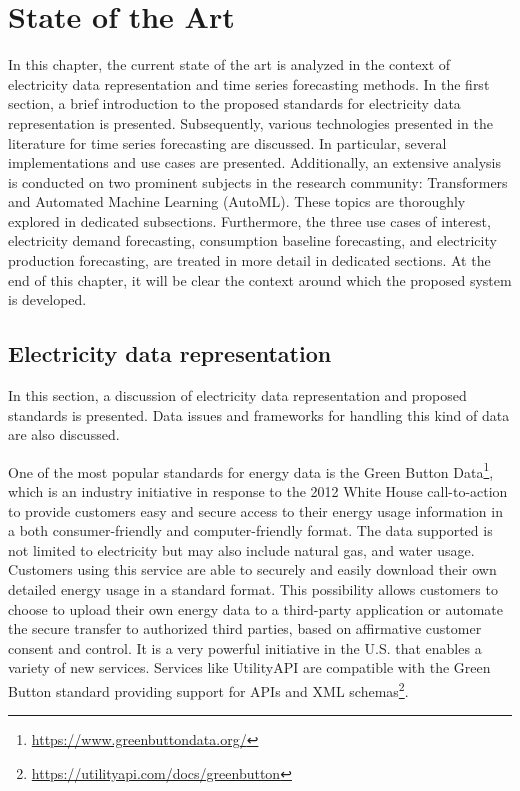 \chapter{State of the Art}
\label{cha:soa}
\vspace{0.4 cm}

In this chapter, the current state of the art is analyzed in the context of electricity data representation and time series forecasting methods.
In the first section, a brief introduction to the proposed standards for electricity data representation is presented.
Subsequently, various technologies presented in the literature for time series forecasting are discussed.
In particular, several implementations and use cases are presented.
Additionally, an extensive analysis is conducted on two prominent subjects in the research community: Transformers and Automated Machine Learning (AutoML).
These topics are thoroughly explored in dedicated subsections.
Furthermore, the three use cases of interest, electricity demand forecasting, consumption baseline forecasting, and electricity production forecasting, are treated in more detail in dedicated sections.
At the end of this chapter, it will be clear the context around which the proposed system is developed.


\section{Electricity data representation}
\label{sec:data}
\vspace{0.2 cm}

In this section, a discussion of electricity data representation and proposed standards is presented.
Data issues and frameworks for handling this kind of data are also discussed.

One of the most popular standards for energy data is the Green Button Data\footnote{ \url{https://www.greenbuttondata.org/} }, which is an industry initiative in response to the 2012 White House call-to-action to provide customers easy and secure access to their energy usage information in a both consumer-friendly and computer-friendly format.
The data supported is not limited to electricity but may also include natural gas, and water usage.
Customers using this service are able to securely and easily download their own detailed energy usage in a standard format.
This possibility allows customers to choose to upload their own energy data to a third-party application or automate the secure transfer to authorized third parties, based on affirmative customer consent and control.
It is a very powerful initiative in the U.S. that enables a variety of new services.
Services like UtilityAPI are compatible with the Green Button standard providing support for APIs and XML schemas\footnote{ \url{https://utilityapi.com/docs/greenbutton} }.

